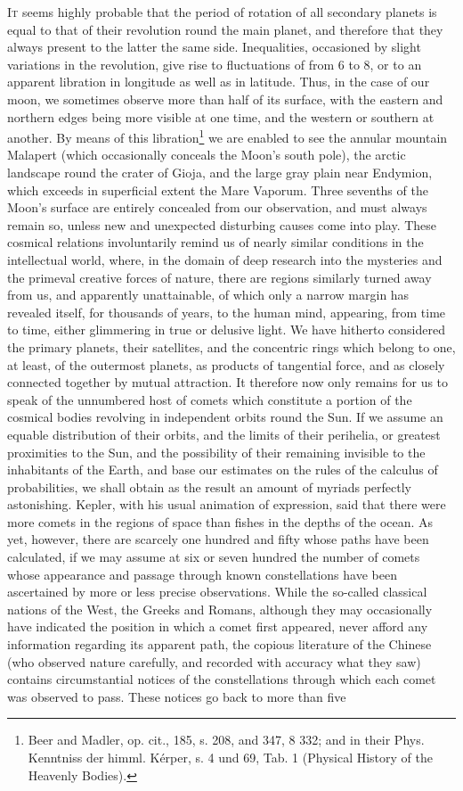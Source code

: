\lettrine[lines=4]{\goudy I}{t} seems highly probable that the period of rotation of all secondary planets is equal to that of their revolution round the main planet, and therefore that they always present to the latter the same side. Inequalities, occasioned by slight variations in the revolution, give rise to fluctuations of from 6 to 8, or to an apparent libration in longitude as well as in latitude. Thus, in the case of our moon, we sometimes observe more than half of its surface, with the eastern and northern edges being more visible at one time, and the western or southern at another. By means of this libration\footnote{Beer and Madler, op. cit., 185, s. 208, and 347, 8 332; and in their Phys. Kenntniss der himml. K\'{e}rper, s. 4 und 69, Tab. 1 (Physical History of the Heavenly Bodies).} we are enabled to see the annular mountain Malapert (which occasionally conceals the Moon's south pole), the arctic landscape round the crater of Gioja, and the large gray plain near Endymion, which exceeds in superficial extent the Mare Vaporum. Three sevenths of the Moon's surface are entirely concealed from our observation, and must always remain so, unless new and unexpected disturbing causes come into play. These cosmical relations involuntarily remind us of nearly similar conditions in the intellectual world, where, in the domain of deep research into the mysteries and the primeval creative forces of nature, there are regions similarly turned away from us, and apparently unattainable, of which only a narrow margin has revealed itself, for thousands of years, to the human mind, appearing, from time to time, either glimmering in true or delusive light. We have hitherto considered the primary planets, their satellites, and the concentric rings which belong to one, at least, of the outermost planets, as products of tangential force, and as closely connected together by mutual attraction. It therefore now only remains for us to speak of the unnumbered host of comets which constitute a portion of the cosmical bodies revolving in independent orbits round the Sun. If we assume an equable distribution of their orbits, and the limits of their perihelia, or greatest proximities to the Sun, and the possibility of their remaining invisible to the inhabitants of the Earth, and base our estimates on the rules of the calculus of probabilities, we shall obtain as the result an amount of myriads perfectly astonishing. Kepler, with his usual animation of expression, said that there were more comets in the regions of space than fishes in the depths of the ocean. As yet, however, there are scarcely one hundred and fifty whose paths have been calculated, if we may assume at six or seven hundred the number of comets whose appearance and passage through known constellations have been ascertained by more or less precise observations. While the so-called classical nations of the West, the Greeks and Romans, although they may occasionally have indicated the position in which a comet first appeared, never afford any information regarding its apparent path, the copious literature of the Chinese (who observed nature carefully, and recorded with accuracy what they saw) contains circumstantial notices of the constellations through which each comet was observed to pass. These notices go back to more than five 